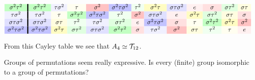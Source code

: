 \documentclass{ximera}
\begin{document}
\begin{example}
\begin{gather*}
\begin{array}{c!{\vline width 2pt}cccccccccccc}
      \sigma^2\tau^2\cellcolor{green!24!white}  & \sigma^2\tau^2\cellcolor{green!24!white}& \tau\sigma^2 \cellcolor{blue!6!white} & \tau\cellcolor{yellow!6!white} & \sigma^2\cellcolor{red!24!white}&  \sigma^2\tau\sigma^2 \cellcolor{blue!24!white}  &  \tau^2 \cellcolor{green!6!white} &  \sigma^2\tau \cellcolor{yellow!24!white}  & \sigma\tau\sigma^2 \cellcolor{blue!12!white}  & e \cellcolor{red!6!white}   & \sigma\cellcolor{red!12!white} &  \sigma\tau^2 \cellcolor{green!12!white}  & \sigma\tau \cellcolor{yellow!12!white}\\
      \tau\sigma^2\cellcolor{blue!6!white}      & \tau\sigma^2\cellcolor{blue!6!white} & \tau\cellcolor{yellow!6!white} & \sigma^2\tau^2 \cellcolor{green!24!white} & \sigma^2\tau\sigma^2\cellcolor{blue!24!white}& \tau^2\cellcolor{green!6!white}& \sigma^2\cellcolor{red!24!white} & \sigma\tau\sigma^2\cellcolor{blue!12!white} & e\cellcolor{red!6!white}  &  \sigma^2\tau \cellcolor{yellow!24!white}  & \sigma\tau^2 \cellcolor{green!12!white}  & \sigma\tau \cellcolor{yellow!12!white}  & \sigma \cellcolor{red!12!white}\\
      \sigma\tau\sigma^2\cellcolor{blue!12!white}    & \sigma\tau\sigma^2\cellcolor{blue!12!white} & \sigma\tau\cellcolor{yellow!12!white} & \tau^2\cellcolor{green!6!white} & \tau\sigma^2\cellcolor{blue!6!white} & \sigma\tau^2\cellcolor{green!12!white}& e\cellcolor{red!6!white} & \sigma^2\tau\sigma^2\cellcolor{blue!24!white} & \sigma\cellcolor{red!12!white}  &  \tau \cellcolor{yellow!6!white}  & \sigma^2\tau^2 \cellcolor{green!24!white}  &  \sigma^2\tau \cellcolor{yellow!24!white}  & \sigma^2 \cellcolor{red!24!white}\\
      \sigma^2\tau\sigma^2\cellcolor{blue!24!white}  & \sigma^2\tau\sigma^2\cellcolor{blue!24!white}& \sigma^2\tau\cellcolor{yellow!24!white} & \sigma\tau^2\cellcolor{green!12!white} & \sigma\tau\sigma^2\cellcolor{blue!12!white} & \sigma^2\tau^2\cellcolor{green!24!white}& \sigma\cellcolor{red!12!white} & \tau\sigma^2\cellcolor{blue!6!white} & \sigma^2\cellcolor{red!24!white}  &  \sigma\tau \cellcolor{yellow!12!white}  & \tau^2 \cellcolor{green!6!white}  &  \tau \cellcolor{yellow!6!white}  & e \cellcolor{red!6!white}\\
    \end{array}
    \end{gather*}

From this Cayley table we see that $A_4\simeq \mathcal{T}_{12}$.
  
  
\end{example}



\begin{question}
  Groups of permutations seem really expressive.  Is every (finite)
  group isomorphic to a group of permutations?
\end{question}
\end{document}
